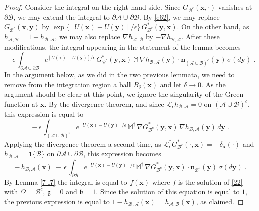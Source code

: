 \documentclass[reqno]{amsart}
\newcounter{as}[section]
\newcommand{\mc}[1]{{\mathcal #1}}
\newcommand{\mf}[1]{{\mathfrak #1}}
\newcommand{\bb}[1]{{\mathbb #1}}
\newcommand{\bs}[1]{{\boldsymbol #1}}
\newcommand{\<}{\langle}
\renewcommand{\>}{\rangle}
\begin{document}
\begin{proof}
Consider the integral on the right-hand side.
Since $G_{\mc B^c} (\bs x, \cdot )$ vanishes at $\partial \mc B$, we
may extend the integral to $\partial \mc A \cup \partial \mc B$.
By \eqref{e62}, we may replace $G_{\mc B^c} (\bs x, \bs y)$ by
$\exp\{[U(\bs x) - U(\bs y)]/\epsilon\} \, G^*_{\mc B^c} (\bs y, \bs x)$. On
the other hand, as $h_{\mc A, \mc B} = 1 - h_{\mc B, \mc A}$, we may
also replace $\nabla h_{\mc A, \mc B}$ by $- \nabla h_{\mc B, \mc A}$.
After these modifications, the integral appearing in the statement of
the lemma becomes
\begin{equation*}
-\, \epsilon\, \int_{\partial \mc A\cup \partial \mc B} e^{[U(\bs x) - U(\bs y)]/\epsilon}
\, G^*_{\mc B^c} (\bs y , \bs x)\, \bb M \, \nabla h_{\mc B, \mc A} (\bs y)
\cdot \bs n_{(\mc A\cup \mc B)^c} (\bs y) \, \sigma(d \bs y)\;.
\end{equation*}
In the argument below, as we did in the two previous lemmata, we need
to remove from the integration region a ball $B_\delta(\bs x)$ and let
$\delta\to 0$. As the argument should be clear at this point, we
ignore the singularity of the Green function at $\bs x$.  By the
divergence theorem, and since $\mc L_\epsilon h_{\mc B, \mc A}=0$ on
$(\mc A\cup \mc B)^c$, this expression is equal to
\begin{equation*}
-\, \epsilon\, \int_{(\mc A\cup \mc B)^c} e^{[U(\bs x) - U(\bs y)]/\epsilon}
\, \bb M^\dagger \, \nabla G^*_{\mc B^c} (\bs y , \bs x)\,
\nabla h_{\mc B, \mc A} (\bs y)\, d \bs y\;.
\end{equation*}
Applying the divergence theorem a second time, as $\mc L^*_\epsilon
G^*_{\mc B^c} (\cdot , \bs x) = - \delta_{\bs x}(\cdot)$ and $h_{\mc
  B, \mc A} = \bs 1\{\mc B\}$ on $\partial \mc A\cup \partial \mc B$,
this
expression becomes
\begin{equation*}
-\,  h_{\mc B, \mc A} (\bs x)
\; -\, \epsilon\, \int_{\partial \mc B} e^{[U(\bs x) - U(\bs y)]/\epsilon}
\, \bb M^\dagger \, \nabla G^*_{\mc B^c} (\bs y , \bs x)
\cdot \bs n_{\mc B^c} (\bs y) \, \sigma(d \bs y)\;.
\end{equation*}
By Lemma \ref{7-l7} the integral is equal to $f(\bs x)$ where $f$ is
the solution of \eqref{22} with $\Omega = \mc B^c$, $\mf g=0$ and
$\mf b=1$. Since the solution of this equation is equal to $1$, the
previous expression is equal to $1- h_{\mc B, \mc A} (\bs x) = h_{\mc
  A, \mc B} (\bs x)$, as claimed.
\end{proof}
\end{document}

